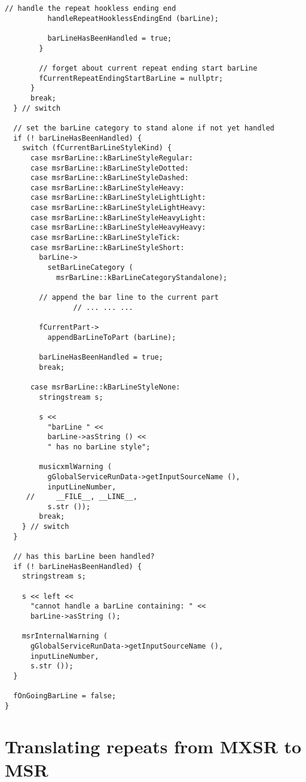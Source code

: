 \begin{lstlisting}[language=CPlusPlus]
          // handle the repeat hookless ending end
          handleRepeatHooklessEndingEnd (barLine);

          barLineHasBeenHandled = true;
        }

        // forget about current repeat ending start barLine
        fCurrentRepeatEndingStartBarLine = nullptr;
      }
      break;
  } // switch

  // set the barLine category to stand alone if not yet handled
  if (! barLineHasBeenHandled) {
    switch (fCurrentBarLineStyleKind) {
      case msrBarLine::kBarLineStyleRegular:
      case msrBarLine::kBarLineStyleDotted:
      case msrBarLine::kBarLineStyleDashed:
      case msrBarLine::kBarLineStyleHeavy:
      case msrBarLine::kBarLineStyleLightLight:
      case msrBarLine::kBarLineStyleLightHeavy:
      case msrBarLine::kBarLineStyleHeavyLight:
      case msrBarLine::kBarLineStyleHeavyHeavy:
      case msrBarLine::kBarLineStyleTick:
      case msrBarLine::kBarLineStyleShort:
        barLine->
          setBarLineCategory (
            msrBarLine::kBarLineCategoryStandalone);

        // append the bar line to the current part
				// ... ... ...

        fCurrentPart->
          appendBarLineToPart (barLine);

        barLineHasBeenHandled = true;
        break;

      case msrBarLine::kBarLineStyleNone:
        stringstream s;

        s <<
          "barLine " <<
          barLine->asString () <<
          " has no barLine style";

        musicxmlWarning (
          gGlobalServiceRunData->getInputSourceName (),
          inputLineNumber,
     //     __FILE__, __LINE__,
          s.str ());
        break;
    } // switch
  }

  // has this barLine been handled?
  if (! barLineHasBeenHandled) {
    stringstream s;

    s << left <<
      "cannot handle a barLine containing: " <<
      barLine->asString ();

    msrInternalWarning (
      gGlobalServiceRunData->getInputSourceName (),
      inputLineNumber,
      s.str ());
  }

  fOnGoingBarLine = false;
}
\end{lstlisting}


\section{Translating repeats from MXSR to MSR}

